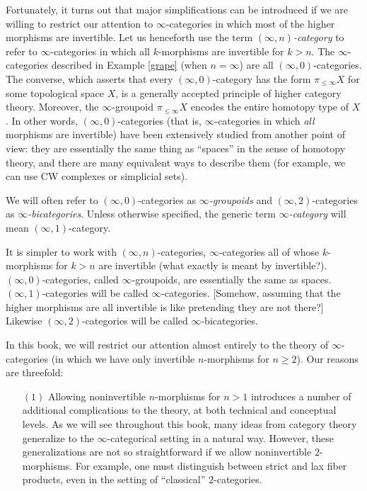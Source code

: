 \begin{1.1.1 Goals and Obstacles}
Fortunately, it turns out that major simplifications can be
introduced if we are willing to restrict our attention to
$\infty$-categories in which most of the higher morphisms are
invertible. Let us henceforth use the term {\it $(\infty,n)$-category}
to refer to $\infty$-categories in which all $k$-morphisms are
invertible for $k > n$. The $\infty$-categories described in
Example \ref{grape} (when $n=\infty$) are all
$(\infty,0)$-categories. The converse, which asserts that every
$(\infty,0)$-category has the form $\pi_{\leq \infty} X$ for some
topological space $X$, is a generally accepted principle of higher
category theory. Moreover, the $\infty$-groupoid $\pi_{\leq \infty} X$ encodes the entire homotopy type of $X$. In other words, $(\infty,0)$-categories (that is,
$\infty$-categories in which {\em all} morphisms are invertible)
have been extensively studied from another point of view: they are
essentially the same thing as ``spaces'' in the sense of homotopy
theory, and there are many equivalent ways to describe them (for
example, we can use CW complexes or simplicial sets).

\begin{convention}
We will often refer to $(\infty,0)$-categories as {\it $\infty$-groupoids} and $(\infty,2)$-categories as {\it $\infty$-bicategories}. Unless otherwise specified, the generic term {\it $\infty$-category} will mean $(\infty,1)$-category. 
\end{convention}
\begin{shaded}
It is simpler to work with $(\infty,n)$-categories, $\infty$-categories all of whose $k$-morphisms for $k>n$ are invertible (what exactly is meant by invertible?). $(\infty,0)$-categories, called $\infty$-groupoids, are essentially the same as spaces. $(\infty,1)$-categories will be called $\infty$-categories. [Somehow, assuming that the higher morphisms are all invertible is like pretending they are not there?] Likewise $(\infty,2)$-categories will be called $\infty$-bicategories.
\end{shaded}

In this book, we will restrict our attention almost entirely to the theory of $\infty$-categories (in which we have only invertible $n$-morphisms for $n \geq 2$). Our reasons are threefold:
\begin{itemize}
\item[$(1)$] Allowing noninvertible $n$-morphisms for $n > 1$ introduces a number of additional complications to the theory, at both technical and conceptual levels. As we will see throughout this book, many ideas from category theory generalize to the $\infty$-categorical setting in a natural way. However, these generalizations are not so straightforward if we allow noninvertible $2$-morphisms. For example, one must distinguish between strict and lax fiber products, even in the setting of ``classical'' $2$-categories.


\end{itemize}
\end{1.1.1 Goals and Obstacles}
